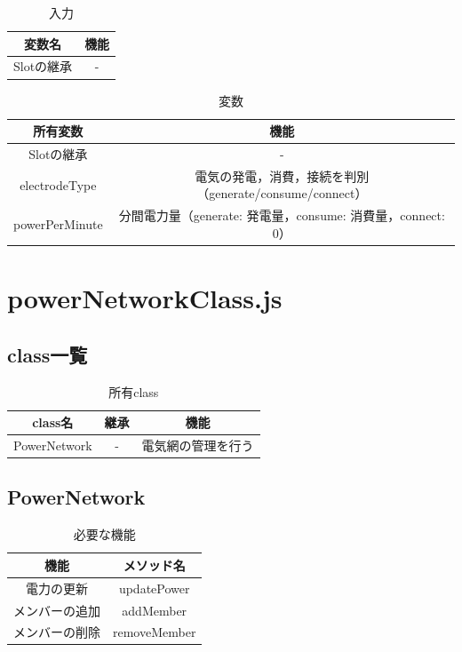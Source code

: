 \documentclass[uplatex,dvipdfmx,report]{jlreq}
\begin{document}
\begin{table}[H]
    \centering
    \caption{入力}
    \begin{tabular}{cc}
        \hline
        変数名 & 機能 \\
        \hline
        \hline
        Slotの継承 & - \\
        \hline
    \end{tabular}
\end{table}

\begin{table}[H]
    \centering
    \caption{変数}
    \begin{tabular}{cc}
        \hline
        所有変数 & 機能 \\
        \hline
        \hline
        Slotの継承 & - \\
        electrodeType & 電気の発電，消費，接続を判別（generate/consume/connect） \\
        powerPerMinute & 分間電力量（generate: 発電量，consume: 消費量，connect: 0） \\
        \hline
    \end{tabular}
\end{table}

\section{powerNetworkClass.js}

\subsection{class一覧}

\begin{table}[H]
    \centering
    \caption{所有class}
    \begin{tabular}{ccc}
        \hline
        class名 & 継承 & 機能 \\
        \hline
        \hline
        PowerNetwork & - & 電気網の管理を行う \\
        \hline
    \end{tabular}
\end{table}

\subsection{PowerNetwork}

\begin{table}[H]
    \centering
    \caption{必要な機能}
    \begin{tabular}{cc}
        \hline
        機能 & メソッド名 \\
        \hline
        \hline
        電力の更新 & updatePower \\
        メンバーの追加 & addMember \\
        メンバーの削除 & removeMember \\
        \hline
    \end{tabular}
\end{table}
\end{document}
